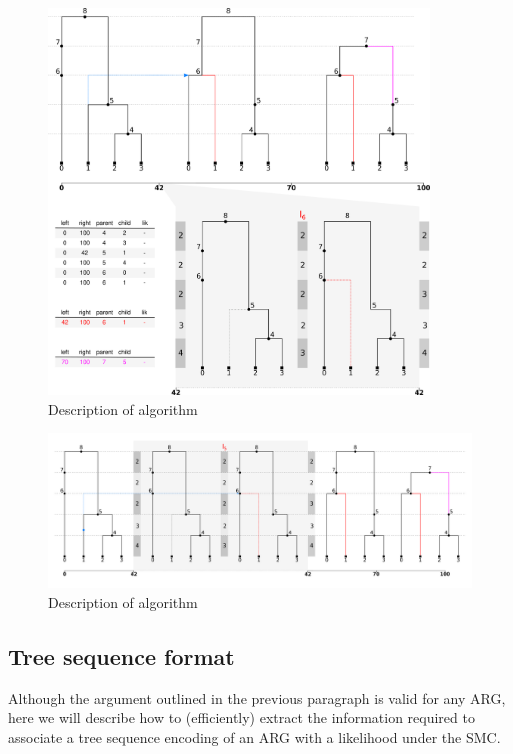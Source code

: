 \documentclass{article}
\begin{document}
\begin{figure}[h!] \label{fig:algo}
\centering
\includegraphics[width=0.9\textwidth]{smc_algo.png}
\caption{Description of algorithm}
\end{figure}

\begin{figure}[h!] \label{fig:algo-flat}
\centering
\includegraphics[width=\textwidth]{smc_algo_flat.png}
\caption{Description of algorithm}
\end{figure}


\subsection{Tree sequence format} \label{par:algo}

Although the argument outlined in the previous paragraph is valid for any ARG, here we 
will describe how to (efficiently) extract the information required to associate a
tree sequence encoding of an ARG with a likelihood under the SMC.\\
\end{document}
